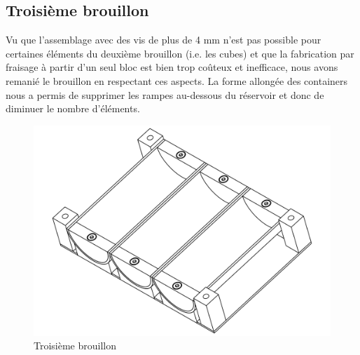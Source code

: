 \subsection{Troisième brouillon}
Vu que l'assemblage avec des vis de plus de 4 mm n'est pas possible pour certaines éléments du deuxième brouillon (i.e. les cubes) et que la fabrication par fraisage à partir d'un seul bloc est bien trop coûteux et inefficace, nous avons remanié le brouillon en respectant ces aspects. La forme allongée des containers nous a permis de supprimer les rampes au-dessous du réservoir et donc de diminuer le nombre d'éléments.

\begin{figure}
    \centering
    \includegraphics[width=\textwidth]{Graphics/Reservoir_final/TROISIEME_BROUILLON.pdf}
    \caption{Troisième brouillon}
\end{figure}



